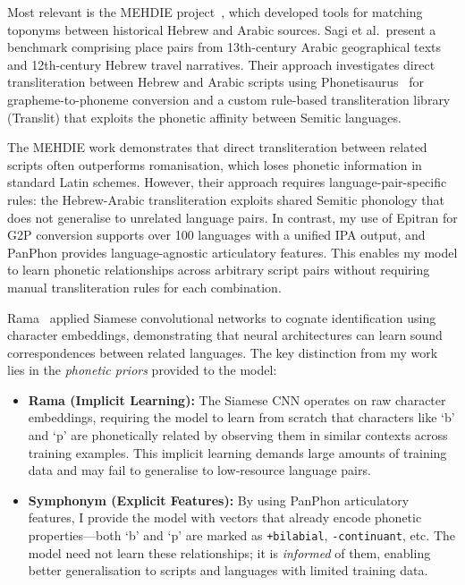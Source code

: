 \documentclass[11pt,a4paper]{article}
\begin{document}
Most relevant is the MEHDIE project~\citep{mehdie2025}, which developed tools for matching toponyms between historical Hebrew and Arabic sources. Sagi et al.\ present a benchmark comprising place pairs from 13th-century Arabic geographical texts and 12th-century Hebrew travel narratives. Their approach investigates direct transliteration between Hebrew and Arabic scripts using Phonetisaurus~\citep{novak2016} for grapheme-to-phoneme conversion and a custom rule-based transliteration library (Translit) that exploits the phonetic affinity between Semitic languages.

The MEHDIE work demonstrates that direct transliteration between related scripts often outperforms romanisation, which loses phonetic information in standard Latin schemes. However, their approach requires language-pair-specific rules: the Hebrew-Arabic transliteration exploits shared Semitic phonology that does not generalise to unrelated language pairs. In contrast, my use of Epitran for G2P conversion supports over 100 languages with a unified IPA output, and PanPhon provides language-agnostic articulatory features. This enables my model to learn phonetic relationships across arbitrary script pairs without requiring manual transliteration rules for each combination.

Rama~\citep{rama2016} applied Siamese convolutional networks to cognate identification using character embeddings, demonstrating that neural architectures can learn sound correspondences between related languages. The key distinction from my work lies in the \emph{phonetic priors} provided to the model:

\begin{itemize}
    \item \textbf{Rama (Implicit Learning):} The Siamese CNN operates on raw character embeddings, requiring the model to learn from scratch that characters like `b' and `p' are phonetically related by observing them in similar contexts across training examples. This implicit learning demands large amounts of training data and may fail to generalise to low-resource language pairs.

    \item \textbf{Symphonym (Explicit Features):} By using PanPhon articulatory features, I provide the model with vectors that already encode phonetic properties---both `b' and `p' are marked as \texttt{+bilabial}, \texttt{-continuant}, etc. The model need not learn these relationships; it is \emph{informed} of them, enabling better generalisation to scripts and languages with limited training data.
\end{itemize}
\end{document}
